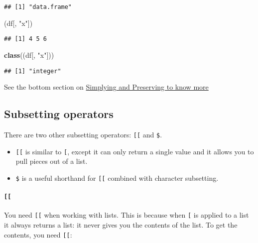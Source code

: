 \documentclass[
]{book}
\newenvironment{Shaded}{\begin{snugshade}}{\end{snugshade}}
\newcommand{\KeywordTok}[1]{\textcolor[rgb]{0.13,0.29,0.53}{\textbf{#1}}}
\newcommand{\NormalTok}[1]{#1}
\newcommand{\StringTok}[1]{\textcolor[rgb]{0.31,0.60,0.02}{#1}}
\providecommand{\tightlist}{%
  \setlength{\itemsep}{0pt}\setlength{\parskip}{0pt}}
\begin{document}
\begin{verbatim}
## [1] "data.frame"
\end{verbatim}

\begin{Shaded}
\begin{Highlighting}[]
\NormalTok{(df[, }\StringTok{"x"}\NormalTok{])}
\end{Highlighting}
\end{Shaded}

\begin{verbatim}
## [1] 4 5 6
\end{verbatim}

\begin{Shaded}
\begin{Highlighting}[]
\KeywordTok{class}\NormalTok{((df[, }\StringTok{"x"}\NormalTok{]))}
\end{Highlighting}
\end{Shaded}

\begin{verbatim}
## [1] "integer"
\end{verbatim}

See the bottom section on \protect\hyperlink{simplify-preserve}{Simplying and Preserving to know more}

\hypertarget{subsetting-operators}{%
\subsection{Subsetting operators}\label{subsetting-operators}}

There are two other subsetting operators: \texttt{{[}{[}} and \texttt{\$}.

\begin{itemize}
\tightlist
\item
  \texttt{{[}{[}} is similar to \texttt{{[}}, except it can only return a single value and it allows you to pull pieces out of a list.
\item
  \texttt{\$} is a useful shorthand for \texttt{{[}{[}} combined with character subsetting.
\end{itemize}

\hypertarget{section}{%
\paragraph{\texorpdfstring{\texttt{{[}{[}}}{{[}{[}}}\label{section}}

You need \texttt{{[}{[}} when working with lists. This is because when \texttt{{[}} is applied to a list it always returns a list: it never gives you the contents of the list. To get the contents, you need \texttt{{[}{[}}:
\end{document}
